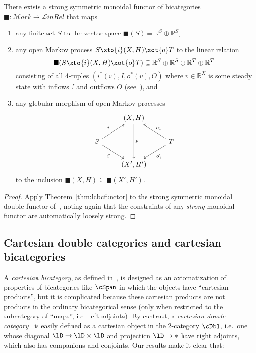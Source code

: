 \begin{thm}
  There exists a strong symmetric monoidal functor of bicategories $\blacksquare : \mathcal{M}\mathit{ark} \to \mathcal{L}\mathit{inRel}$ that maps
  \begin{enumerate}
  \item any finite set $S$ to the vector space $\blacksquare(S) = \mathbb{R}^S \oplus \mathbb{R}^S$,
  \item any open Markov process $S \xto{i} (X,H) \xot{o} T$ to the linear relation
    \[ \blacksquare(S \xto{i} (X,H) \xot{o} T) \subseteq \mathbb{R}^S\oplus \mathbb{R}^S\oplus \mathbb{R}^T\oplus \mathbb{R}^T \]
    consisting of all 4-tuples $(i^*(v),I,o^*(v),O)$ where $v\in \mathbb{R}^X$ is some steady state with inflows $I$ and outflows $O$ (see~\cite[Definition 2.7]{bc:markov}), and
  \item any globular morphism of open Markov processes
    \[
      \begin{tikzcd}
        & {(X,H)} \arrow[dd, "p"] &  \\
        S \arrow[ru, "i_1"] \arrow[rd, "i_1'"'] &  & T \arrow[lu, "o_1"'] \arrow[ld, "o_1'"] \\
        & {(X',H')} & 
      \end{tikzcd}
    \]
    to the inclusion $\blacksquare(X,H) \subseteq \blacksquare(X',H')$.
  \end{enumerate}
\end{thm}
\begin{proof}
  Apply Theorem~\ref{thm:lcbcfunctor} to the strong symmetric monoidal double functor of~\cite[Theorem 5.5]{bc:markov}, noting again that the constraints of any \emph{strong} monoidal functor are automatically loosely strong.
\end{proof}

\subsection{Cartesian double categories and cartesian bicategories}
\label{sec:cartesian}

A \emph{cartesian bicategory}, as defined in~\cite{cw:cart-bicats-i,ckww:cartbicats-ii}, is designed as an axiomatization of properties of bicategories like $\cSpan$ in which the objects have ``cartesian products'', but it is complicated because these cartesian products are not products in the ordinary bicategorical sense (only when restricted to the subcategory of ``maps'', i.e.\ left adjoints).
By contrast, a \emph{cartesian double category}~\cite{aleiferi2018cartesian} is easily defined as a cartesian object in the 2-category $\cDbl$, i.e.\ one whose diagonal $\lD \to \lD\times \lD$ and projection $\lD\to *$ have right adjoints, which also has companions and conjoints.
Our results make it clear that:

